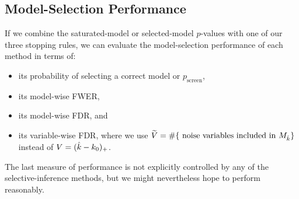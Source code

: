 \documentclass{article}
\begin{document}
\subsection{Model-Selection Performance}

If we combine the saturated-model or selected-model $p$-values with one of our three stopping rules, we can evaluate the model-selection performance of each method in terms of:
\begin{itemize}
\item its probability of selecting a correct model or $p_{\text{screen}}$,
\item its model-wise FWER,
\item its model-wise FDR, and
\item its variable-wise FDR, where we use $\widetilde{V}= \#\{\text{ noise variables included in } M_{\hat{k}}\}$ instead of $V=(\hat{k}-k_0)_+$.
\end{itemize} 
The last measure of performance is not explicitly controlled by any of the selective-inference methods, but we might nevertheless hope to perform reasonably. 


\end{document}
